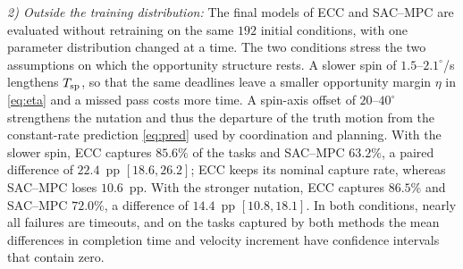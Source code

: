 \textit{2) Outside the training distribution:} The final models of ECC and SAC--MPC are evaluated without retraining on the same $192$ initial conditions, with one parameter distribution changed at a time. The two conditions stress the two assumptions on which the opportunity structure rests. A slower spin of $1.5$--$2.1^{\circ}$/s lengthens $T_{\mathrm{sp}}$, so that the same deadlines leave a smaller opportunity margin $\eta$ in \eqref{eq:eta} and a missed pass costs more time. A spin-axis offset of $20$--$40^{\circ}$ strengthens the nutation and thus the departure of the truth motion from the constant-rate prediction \eqref{eq:pred} used by coordination and planning. With the slower spin, ECC captures $85.6\%$ of the tasks and SAC--MPC $63.2\%$, a paired difference of $22.4$~pp $[18.6,26.2]$; ECC keeps its nominal capture rate, whereas SAC--MPC loses $10.6$~pp. With the stronger nutation, ECC captures $86.5\%$ and SAC--MPC $72.0\%$, a difference of $14.4$~pp $[10.8,18.1]$. In both conditions, nearly all failures are timeouts, and on the tasks captured by both methods the mean differences in completion time and velocity increment have confidence intervals that contain zero.
